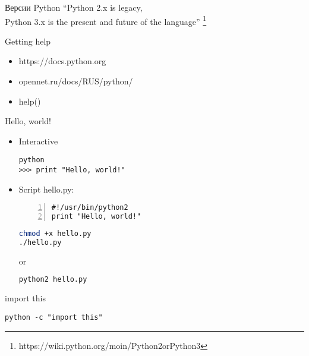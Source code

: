 \documentclass[hyperref={pdftex,unicode}]{beamer}
\begin{document}
\begin{frame}{Версии Python}
  \centering
  ``Python 2.x is legacy, \\
  Python 3.x is the present
  and future of the language'' \footnote[frame]{
    https://wiki.python.org/moin/Python2orPython3}
\end{frame}

\begin{frame}{Getting help}
  \begin{itemize}
    \item https://docs.python.org
    \item opennet.ru/docs/RUS/python/
    \item help()
  \end{itemize}
\end{frame}

\begin{frame}[fragile]{Hello, world!}
  \begin{itemize}
  \item Interactive
    \begin{lstlisting}
python
>>> print "Hello, world!"
    \end{lstlisting}
  \item Script hello.py:
    \begin{lstlisting}[numbers=left]
#!/usr/bin/python2
print "Hello, world!"
    \end{lstlisting}

  \begin{minipage}{0.4\linewidth}
     \begin{lstlisting}[language=bash]
chmod +x hello.py
./hello.py
     \end{lstlisting}
   \end{minipage}
   \hfill or \hfill
   \begin{minipage}{0.4\linewidth}
     \begin{lstlisting}[language=bash]
python2 hello.py
     \end{lstlisting}
   \end{minipage}

  \end{itemize}
\end{frame}

\begin{frame}[fragile]{import this}
  \begin{center}
    \texttt{python -c "import this"}
  \end{center}
\end{frame}
\end{document}
